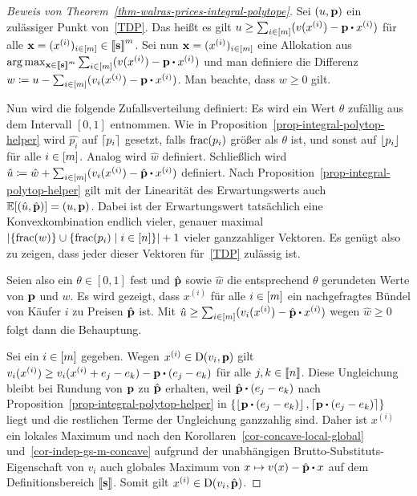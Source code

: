 \begin{proof}[Beweis von Theorem~\ref{thm-walras-prices-integral-polytope}]
	Sei $(u, \mathbf{p})$ ein zulässiger Punkt von~\eqref{TDP}.
	Das heißt es gilt $u \geq \sum_{i\in\first{m}} ( v(x^{(i)}) - \fp \bcdot x^{(i)})$ für alle $\mathbf{x} = (x^{(i)})_{i\in\left[ m \right]}\in\left\llbracket \mathbf{s} \right\rrbracket^m$.
	Sei nun $\mathbf{x} = (x^{(i)})_{i\in\left[ m \right]}$ eine Allokation aus $\arg\max_{\fx\in\ffirst{\fs}^m} \sum_{i\in\first{m}} (v(x^{(i)}) - \fp \bcdot x^{(i)})$ und man definiere die Differenz $w \coloneqq u - \sum_{i\in\first{m}} (v_i(x^{(i)}) - \fp \bcdot x^{(i)})$.
	Man beachte, dass $w \geq 0$ gilt.
	
	Nun wird die folgende Zufallsverteilung definiert:
	Es wird ein Wert $\theta$ zufällig aus dem Intervall $[0,1]$ entnommen.
	Wie in Proposition~\ref{prop-integral-polytop-helper} wird $\hat{p_i}$ auf $\left\lceil p_i \right\rceil$ gesetzt, falls $\operatorname{frac}(p_i)$ größer als $\theta$ ist, und sonst auf $\left\lfloor p_i \right\rfloor$ für alle $i\in\left[ m \right]$.
	Analog wird $\hat{w}$ definiert.
	Schließlich wird $\hat{u}\coloneqq\hat{w}+ \sum_{i\in\first{m}} (v_i(x^{(i)}) - \hat{\fp} \bcdot x^{(i)})$ definiert.
	Nach Proposition~\ref{prop-integral-polytop-helper} gilt mit der Linearität des Erwartungswerts auch $\mathbb{E}[(\hat{u},\hat{\mathbf{p}})] = (u, \mathbf{p})$.
	Dabei ist der Erwartungswert tatsächlich eine Konvexkombination endlich vieler, genauer maximal $\left\lvert  \{ \operatorname{frac}(w) \} \cup \{ \operatorname{frac}(p_i) \mid i\in\left[ n \right] \}  \right\rvert + 1$ vieler ganzzahliger Vektoren.
	Es genügt also zu zeigen, dass jeder dieser Vektoren für~\eqref{TDP} zulässig ist.
	
	Seien also ein $\theta\in [0,1]$ fest und $\hat{\mathbf{p}}$ sowie $\hat{w}$ die entsprechend $\theta$ gerundeten Werte von $\mathbf{p}$ und $w$.
	Es wird gezeigt, dass $x^{(i)}$ für alle $i\in\left[ m \right]$ ein nachgefragtes Bündel von Käufer $i$ zu Preisen $\hat{\mathbf{p}}$ ist.
	Mit $\hat{u}\geq \sum_{i\in\first{m}}(v_i(x^{(i)}) - \hat{\fp}\bcdot x^{(i)})$ wegen $\hat{w}\geq0$ folgt dann die Behauptung.
	
	Sei ein $i\in\left[ m \right]$ gegeben. Wegen $x^{(i)}\in\operatorname{D}(v_i, \mathbf{p})$ gilt $v_i(x^{(i)}) \geq v_i(x^{(i)} + e_j - e_k) - \fp \bcdot (e_j - e_k)$ für alle $j,k\in\left\llbracket n \right\rrbracket$.
	Diese Ungleichung bleibt bei Rundung von $\mathbf{p}$ zu $\hat{\mathbf{p}}$ erhalten, weil $\hat{\fp}\bcdot (e_j - e_k)$ nach Proposition~\ref{prop-integral-polytop-helper} in $\{ \floor{\fp\bcdot(e_j - e_k)}, \ceil{\fp\bcdot(e_j - e_k)} \}$ liegt und die rest\-lichen Terme der Ungleichung ganzzahlig sind.
	Daher ist $x^{(i)}$ ein lokales Maximum und nach den Korollaren~\ref{cor-concave-local-global} und~\ref{cor-indep-gs-m-concave} aufgrund der unabhängigen Brutto-Substituts-Eigenschaft von $v_i$ auch globales Maximum von $x\mapsto v(x) - \hat{\fp} \bcdot x$ auf dem Definitionsbereich $\left\llbracket \mathbf{s} \right\rrbracket$.
	Somit gilt $x^{(i)}\in\operatorname{D}(v_i, \hat{\mathbf{p}})$.
\end{proof}
